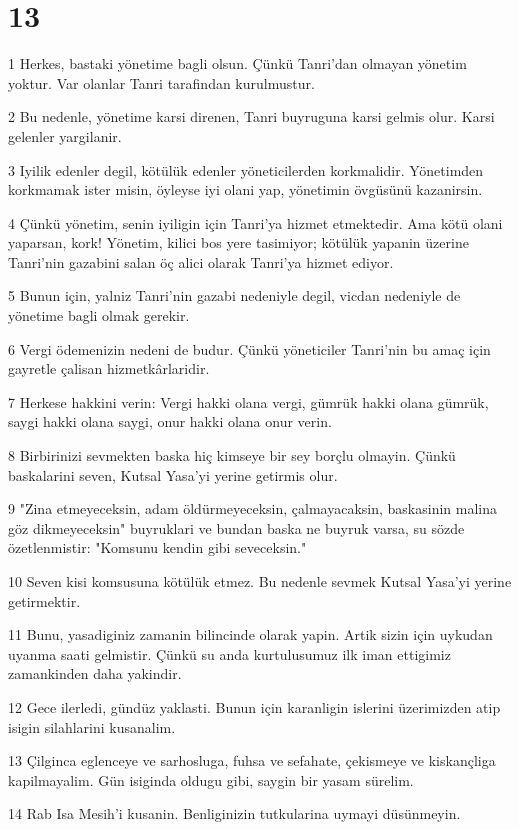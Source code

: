\chapter{13}

\par 1 Herkes, bastaki yönetime bagli olsun. Çünkü Tanri'dan olmayan yönetim yoktur. Var olanlar Tanri tarafindan kurulmustur.
\par 2 Bu nedenle, yönetime karsi direnen, Tanri buyruguna karsi gelmis olur. Karsi gelenler yargilanir.
\par 3 Iyilik edenler degil, kötülük edenler yöneticilerden korkmalidir. Yönetimden korkmamak ister misin, öyleyse iyi olani yap, yönetimin övgüsünü kazanirsin.
\par 4 Çünkü yönetim, senin iyiligin için Tanri'ya hizmet etmektedir. Ama kötü olani yaparsan, kork! Yönetim, kilici bos yere tasimiyor; kötülük yapanin üzerine Tanri'nin gazabini salan öç alici olarak Tanri'ya hizmet ediyor.
\par 5 Bunun için, yalniz Tanri'nin gazabi nedeniyle degil, vicdan nedeniyle de yönetime bagli olmak gerekir.
\par 6 Vergi ödemenizin nedeni de budur. Çünkü yöneticiler Tanri'nin bu amaç için gayretle çalisan hizmetkârlaridir.
\par 7 Herkese hakkini verin: Vergi hakki olana vergi, gümrük hakki olana gümrük, saygi hakki olana saygi, onur hakki olana onur verin.
\par 8 Birbirinizi sevmekten baska hiç kimseye bir sey borçlu olmayin. Çünkü baskalarini seven, Kutsal Yasa'yi yerine getirmis olur.
\par 9 "Zina etmeyeceksin, adam öldürmeyeceksin, çalmayacaksin, baskasinin malina göz dikmeyeceksin" buyruklari ve bundan baska ne buyruk varsa, su sözde özetlenmistir: "Komsunu kendin gibi seveceksin."
\par 10 Seven kisi komsusuna kötülük etmez. Bu nedenle sevmek Kutsal Yasa'yi yerine getirmektir.
\par 11 Bunu, yasadiginiz zamanin bilincinde olarak yapin. Artik sizin için uykudan uyanma saati gelmistir. Çünkü su anda kurtulusumuz ilk iman ettigimiz zamankinden daha yakindir.
\par 12 Gece ilerledi, gündüz yaklasti. Bunun için karanligin islerini üzerimizden atip isigin silahlarini kusanalim.
\par 13 Çilginca eglenceye ve sarhosluga, fuhsa ve sefahate, çekismeye ve kiskançliga kapilmayalim. Gün isiginda oldugu gibi, saygin bir yasam sürelim.
\par 14 Rab Isa Mesih'i kusanin. Benliginizin tutkularina uymayi düsünmeyin.

